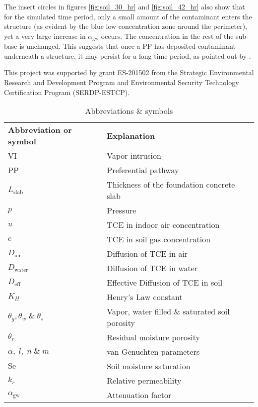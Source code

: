 \documentclass[journal=esthag,manuscript=article]{achemso}
\begin{document}
The insert circles in figures \ref{fig:soil_30_hr} and \ref{fig:soil_42_hr} also show that for the simulated time period, only a small amount of the contaminant enters the structure (as evident by the blue low concentration zone around the perimeter), yet a very large increase in $\alpha_\mathrm{gw}$ occurs.
The concentration in the rest of the sub-base is unchanged.
This suggests that once a PP has deposited contaminant underneath a structure, it may persist for a long time period, as pointed out by \citeauthor{guo_vapor_2015}\cite{guo_vapor_2015}.

\begin{acknowledgement}
This project was supported by grant ES-201502 from the Strategic Environmental Research and Development Program and Environmental Security Technology Certification Program (SERDP-ESTCP).
\end{acknowledgement}

\begin{table}[htb!]
  \caption{Abbreviations \& symbols}
  \begin{tabular}{l l}
  \toprule
  \textbf{Abbreviation or symbol}     & \textbf{Explanation} \\
  VI                                  & Vapor intrusion \\
  PP                                  & Preferential pathway \\
  $L_\mathrm{slab}$                   & Thickness of the foundation concrete slab \\
  $p$                                 & Pressure \\
  $u$                                 & TCE in indoor air concentration \\
  $c$                                 & TCE in soil gas concentration \\
  $D_\mathrm{air}$                    & Diffusion of TCE in air \\
  $D_\mathrm{water}$                  & Diffusion of TCE in water \\
  $D_\mathrm{eff}$                    & Effective Diffusion of TCE in soil \\
  $K_H$                               & Henry's Law constant \\
  $\theta_g, \theta_w\;\&\;\theta_s$  & Vapor, water filled \& saturated soil porosity \\
  $\theta_r$                          & Residual moisture porosity \\
  $\alpha,\; l,\; n\;\&\; m$          & van Genuchten parameters \\
  $\mathrm{Se}$                       & Soil moisture saturation \\
  $k_r$                               & Relative permeability \\
  $\alpha_\mathrm{gw}$                & Attenuation factor \\
  \bottomrule
  \end{tabular}
\end{table}


\end{document}
